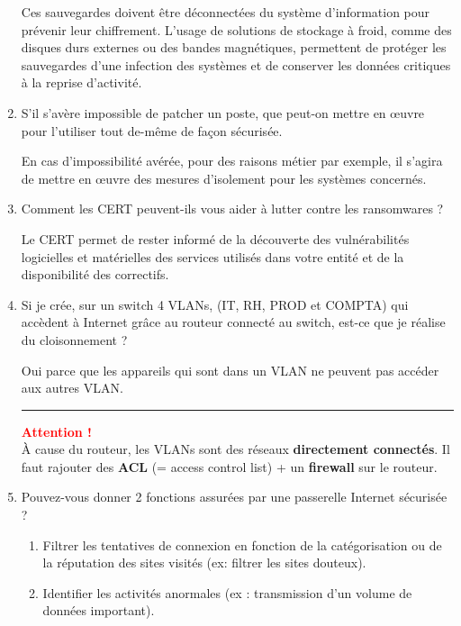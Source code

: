 \documentclass[a4paper]{article}
\begin{document}
\begin{enumerate}
\begin{example}
    Ces sauvegardes doivent être déconnectées du système d’information pour prévenir leur chiffrement. L’usage de solutions de stockage à froid, comme des disques durs externes ou des bandes magnétiques, permettent de protéger les sauvegardes d’une infection des systèmes et de conserver les données critiques à la reprise d’activité.
\end{example}



\item S'il s’avère impossible de patcher un poste, que peut-on mettre en œuvre pour l'utiliser tout de-même de façon sécurisée.
\begin{example}
    En cas d’impossibilité avérée, pour des raisons métier par exemple, il s’agira de mettre en œuvre des mesures d’isolement pour les systèmes concernés.
\end{example}



\item Comment les CERT peuvent-ils vous aider à lutter contre les ransomwares ?
\begin{example}
    Le CERT permet de rester informé de la découverte des vulnérabilités logicielles et matérielles des services utilisés dans votre entité et de la disponibilité des correctifs.
\end{example}



\item Si je crée, sur un switch 4 VLANs, (IT, RH, PROD et COMPTA) qui accèdent à Internet grâce au routeur connecté au switch, est-ce que je réalise du cloisonnement ?
\begin{example}
    Oui parce que les appareils qui sont dans un VLAN ne peuvent pas accéder aux autres VLAN.

    \begin{center} \rule{0.99\linewidth}{0.1mm} \end{center}

    \textcolor{red}{\textbf{Attention !}} \\
    À cause du routeur, les VLANs sont des réseaux \textbf{directement connectés}. Il faut rajouter des \textbf{ACL} (= access control list) + un \textbf{firewall} sur le routeur.
\end{example}



\item Pouvez-vous donner 2 fonctions assurées par une passerelle Internet sécurisée ?
\begin{example}
    \begin{enumerate}
        \item Filtrer les tentatives de connexion en fonction de la catégorisation ou de la réputation des sites visités (ex: filtrer les sites douteux).
        \item Identifier les activités anormales (ex : transmission d’un volume de données important).
    \end{enumerate}
\end{example}




\end{enumerate}
\end{document}
